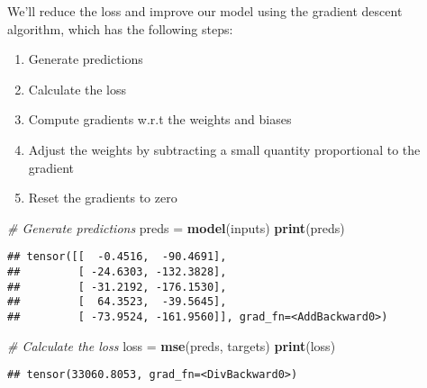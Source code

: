 \documentclass[]{book}
\newenvironment{Shaded}{\begin{snugshade}}{\end{snugshade}}
\newcommand{\CommentTok}[1]{\textcolor[rgb]{0.56,0.35,0.01}{\textit{#1}}}
\newcommand{\KeywordTok}[1]{\textcolor[rgb]{0.13,0.29,0.53}{\textbf{#1}}}
\newcommand{\NormalTok}[1]{#1}
\newcommand{\OperatorTok}[1]{\textcolor[rgb]{0.81,0.36,0.00}{\textbf{#1}}}
\newcommand{\StringTok}[1]{\textcolor[rgb]{0.31,0.60,0.02}{#1}}
\providecommand{\tightlist}{%
  \setlength{\itemsep}{0pt}\setlength{\parskip}{0pt}}
\begin{document}
We'll reduce the loss and improve our model using the gradient descent algorithm, which has the following steps:

\begin{enumerate}
\def\labelenumi{\arabic{enumi}.}
\tightlist
\item
  Generate predictions
\item
  Calculate the loss
\item
  Compute gradients w.r.t the weights and biases
\item
  Adjust the weights by subtracting a small quantity proportional to the gradient
\item
  Reset the gradients to zero
\end{enumerate}

\begin{Shaded}
\begin{Highlighting}[]
\CommentTok{# Generate predictions}
\NormalTok{preds =}\StringTok{ }\KeywordTok{model}\NormalTok{(inputs)}
\KeywordTok{print}\NormalTok{(preds)}
\end{Highlighting}
\end{Shaded}

\begin{verbatim}
## tensor([[  -0.4516,  -90.4691],
##         [ -24.6303, -132.3828],
##         [ -31.2192, -176.1530],
##         [  64.3523,  -39.5645],
##         [ -73.9524, -161.9560]], grad_fn=<AddBackward0>)
\end{verbatim}

\begin{Shaded}
\begin{Highlighting}[]
\CommentTok{# Calculate the loss}
\NormalTok{loss =}\StringTok{ }\KeywordTok{mse}\NormalTok{(preds, targets)}
\KeywordTok{print}\NormalTok{(loss)}
\end{Highlighting}
\end{Shaded}

\begin{verbatim}
## tensor(33060.8053, grad_fn=<DivBackward0>)
\end{verbatim}

\begin{Shaded}
\end{Shaded}
\end{document}
